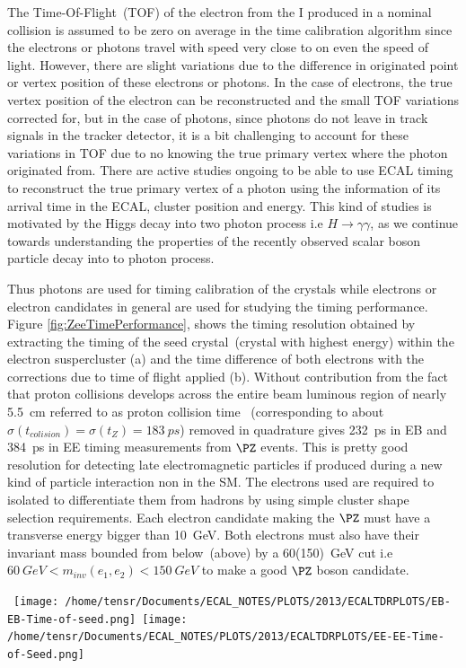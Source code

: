 The Time-Of-Flight~(TOF) of the electron from the I produced in a nominal collision is assumed to be zero on average in the time calibration algorithm since the electrons or photons travel with speed very close to on even the speed of light. However, there are slight variations due to the difference in originated point or vertex position of these electrons or photons. In the case of electrons, the true vertex position of the electron can be reconstructed and the small TOF variations corrected for, but in the case of photons, since photons do not leave in track signals in the tracker detector, it is a bit challenging to account for these variations in TOF due to no knowing the true primary vertex where the photon originated from. There are active studies ongoing to be able to use ECAL timing to reconstruct the true primary vertex of a photon using the information of its arrival time in the ECAL, cluster position and energy. This kind of studies is motivated by the Higgs decay into two photon process  i.e $H \rightarrow \gamma \gamma $, as we continue towards understanding the properties of the recently observed scalar boson particle decay into to photon process.  

Thus photons are used for timing calibration of the \pb crystals while electrons or electron candidates in general are used for studying the timing performance.
Figure \ref{fig:ZeeTimePerformance}, shows the timing resolution obtained  by extracting the timing of the seed crystal~(crystal with highest energy) within the electron suspercluster (a) and the time difference of both electrons with the corrections due to time of flight applied (b). Without contribution from the fact that proton collisions develops across the entire beam luminous region of nearly 5.5~cm referred to as proton collision time ~(corresponding to about $\sigma(t_{colision}) = \sigma(t_{Z}) = 183~ps$) removed in quadrature gives 232~ps in EB and 384~ps in EE timing measurements from $\PZ$ events. This is pretty good resolution for detecting late electromagnetic particles if produced during a new kind of particle interaction non in the SM.
The electrons used are required to isolated to differentiate them from hadrons by using simple cluster shape  selection requirements. Each electron candidate making the $\PZ$ must have  a transverse energy bigger than 10~GeV. Both electrons must also have their invariant mass bounded from below~(above) by a 60(150)~GeV cut i.e $ 60~GeV < m_{inv}(e_{1},e_{2}) < 150~ GeV$ to make a good $\PZ$ boson candidate. 

\begin{center}\label{TimeRES}
\centering
\mbox{
\texttt{[image: /home/tensr/Documents/ECAL\_NOTES/PLOTS/2013/ECALTDRPLOTS/EB-EB-Time-of-seed.png]}\quad
\texttt{[image: /home/tensr/Documents/ECAL\_NOTES/PLOTS/2013/ECALTDRPLOTS/EE-EE-Time-of-Seed.png]}}
\label{fig:ZeeTimePerformance}
\end{center}

